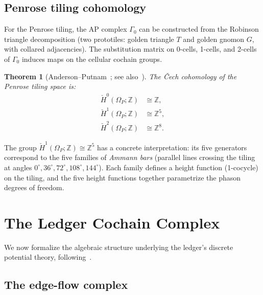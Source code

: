 \documentclass[12pt]{article}
\newtheorem{theorem}{Theorem}[section]
\theoremstyle{definition}
\theoremstyle{remark}
\newcommand{\ZZ}{\mathbb{Z}}
\newcommand{\Hcech}{\check{H}}
\begin{document}
\subsection{Penrose tiling cohomology}

For the Penrose tiling, the AP complex $\Gamma_0$ can be constructed from the Robinson triangle decomposition (two prototiles: golden triangle $T$ and golden gnomon $G$, with collared adjacencies). The substitution matrix on 0-cells, 1-cells, and 2-cells of $\Gamma_0$ induces maps on the cellular cochain groups.

\begin{theorem}[Anderson--Putnam~\cite{AndersonPutnam1998}; see also~\cite{Forrest2002}]
\label{thm:penrose-cohomology}
The \v{C}ech cohomology of the Penrose tiling space is:
\begin{align}
\Hcech^0(\Omega_P; \ZZ) &\cong \ZZ, \label{eq:H0}\\
\Hcech^1(\Omega_P; \ZZ) &\cong \ZZ^5, \label{eq:H1}\\
\Hcech^2(\Omega_P; \ZZ) &\cong \ZZ^8. \label{eq:H2}
\end{align}
\end{theorem}

The group $\Hcech^1(\Omega_P; \ZZ) \cong \ZZ^5$ has a concrete interpretation: its five generators correspond to the five families of \emph{Ammann bars} (parallel lines crossing the tiling at angles $0^\circ, 36^\circ, 72^\circ, 108^\circ, 144^\circ$). Each family defines a height function (1-cocycle) on the tiling, and the five height functions together parametrize the phason degrees of freedom.

\section{The Ledger Cochain Complex}
\label{sec:ledger-cohomology}

We now formalize the algebraic structure underlying the ledger's discrete potential theory, following~\cite{PardoGuerraEtAl2026}.

\subsection{The edge-flow complex}
\end{document}
